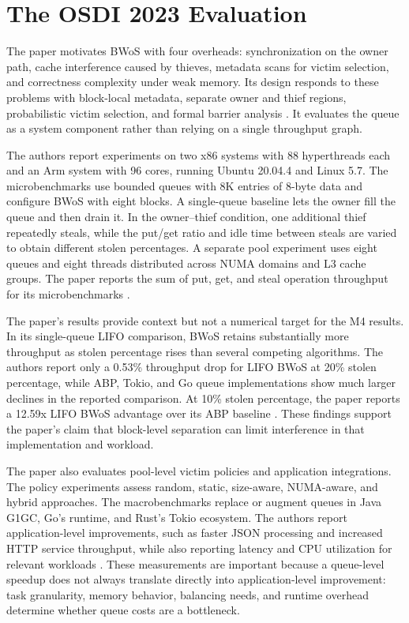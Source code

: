 \documentclass[conference]{IEEEtran}
\begin{document}
\section{The OSDI 2023 Evaluation}
The paper motivates BWoS with four overheads: synchronization on the owner path, cache interference caused by thieves, metadata scans for victim selection, and correctness complexity under weak memory. Its design responds to these problems with block-local metadata, separate owner and thief regions, probabilistic victim selection, and formal barrier analysis \cite{wang2023bwos}. It evaluates the queue as a system component rather than relying on a single throughput graph.

The authors report experiments on two x86 systems with 88 hyperthreads each and an Arm system with 96 cores, running Ubuntu 20.04.4 and Linux 5.7. The microbenchmarks use bounded queues with 8K entries of 8-byte data and configure BWoS with eight blocks. A single-queue baseline lets the owner fill the queue and then drain it. In the owner--thief condition, one additional thief repeatedly steals, while the put/get ratio and idle time between steals are varied to obtain different stolen percentages. A separate pool experiment uses eight queues and eight threads distributed across NUMA domains and L3 cache groups. The paper reports the sum of put, get, and steal operation throughput for its microbenchmarks \cite{wang2023bwos}.

The paper's results provide context but not a numerical target for the M4 results. In its single-queue LIFO comparison, BWoS retains substantially more throughput as stolen percentage rises than several competing algorithms. The authors report only a 0.53\% throughput drop for LIFO BWoS at 20\% stolen percentage, while ABP, Tokio, and Go queue implementations show much larger declines in the reported comparison. At 10\% stolen percentage, the paper reports a 12.59x LIFO BWoS advantage over its ABP baseline \cite{wang2023bwos}. These findings support the paper's claim that block-level separation can limit interference in that implementation and workload.

The paper also evaluates pool-level victim policies and application integrations. The policy experiments assess random, static, size-aware, NUMA-aware, and hybrid approaches. The macrobenchmarks replace or augment queues in Java G1GC, Go's runtime, and Rust's Tokio ecosystem. The authors report application-level improvements, such as faster JSON processing and increased HTTP service throughput, while also reporting latency and CPU utilization for relevant workloads \cite{wang2023bwos}. These measurements are important because a queue-level speedup does not always translate directly into application-level improvement: task granularity, memory behavior, balancing needs, and runtime overhead determine whether queue costs are a bottleneck.
\end{document}

